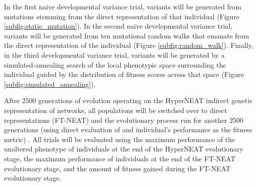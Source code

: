 In the first naive developmental variance trial, variants will be generated from mutations stemming from the direct representation of that individual (Figure \ref{subfig:static_mutation}). In the second naive developmental variance trial, variants will be generated from ten mutational random walks that emanate from the direct representation of the individual (Figure \ref{subfig:random_walk}). Finally, in the third developmental variance trial, variants will be generated by a simulated-annealing search of the local phenotypic space surrounding the individual guided by the distribution of fitness scores across that space (Figure \ref{subfig:simulated_annealing}). 

After 2500 generations of evolution operating on the HyperNEAT indirect genetic representation of networks, all populations will be switched over to direct representations (FT-NEAT) and the evolutionary process run for another 2500 generations (using direct evaluation of and individual's performance as the fitness metric) \cite{Clune2011OnRegularity}. All trials will be evaluated using the maximum performance of the unaltered phenotype of individuals at the end of the HyperNEAT evolutionary stage, the maximum performance of individuals at the end of the FT-NEAT evolutionary stage, and the amount of fitness gained during the FT-NEAT evolutionary stage.





